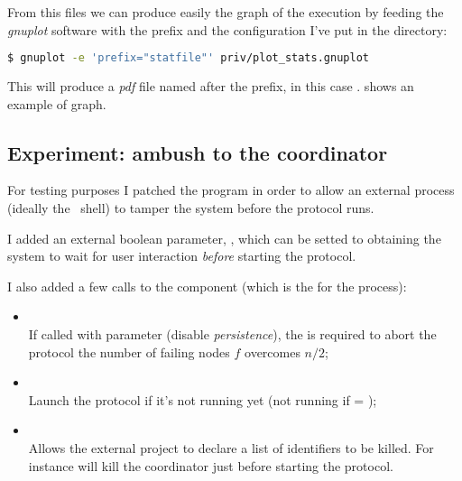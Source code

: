 From this files we can produce easily the graph of the execution by
feeding the \emph{gnuplot} software with the prefix and the configuration
I've put in the  directory:
\begin{lstlisting}[language=bash]
$ gnuplot -e 'prefix="statfile"' priv/plot_stats.gnuplot
\end{lstlisting}

This will produce a \emph{pdf} file named after the prefix, in this case
.  shows an example of graph.


\subsection{Experiment: ambush to the coordinator}

For testing purposes I patched the program in order to allow an external
process (ideally the \Erlang\ shell) to tamper the system before the
protocol runs.

I added an external boolean parameter, , which
can be setted to  obtaining the system to wait for user
interaction \emph{before} starting the protocol.

I also added a few calls to the  component (which is
the  for the process):
\begin{itemize}
\item   {} \\
        If called with parameter  (disable
        \emph{persistence}), the  is required to abort the
        protocol the number of failing nodes $f$ overcomes $n/2$;
\item   {} \\
        Launch the protocol if it's not running yet
        (not running if  = );
\item   {} \\
        Allows the external project to declare a list of identifiers to be
        killed. For instance  will kill the
        coordinator just before starting the protocol.
\end{itemize}

